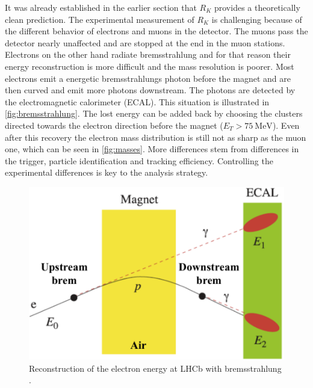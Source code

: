 
It was already established in the earlier section that $R_K$ provides
a theoretically clean prediction.
The experimental measurement of $R_K$ is challenging because
of the different behavior of electrons and muons in the detector.
The muons pass the detector nearly unaffected and are stopped at the end
in the muon stations.
Electrons on the other hand radiate bremsstrahlung and for that
reason their energy reconstruction is more difficult
and the mass resolution is poorer.
Most electrons emit a energetic bremsstrahlungs photon before the magnet and
are then curved and emit more photons downstream. The photons are detected by the
electromagnetic calorimeter (ECAL).
This situation is illustrated
in \autoref{fig:bremsstrahlung}.
The lost energy can be added back by choosing
the clusters directed towards the electron direction before the magnet ($E_{T}>\SI{75}{\mega\electronvolt}$).
Even after this recovery the electron mass distribution is still not as sharp as the muon one, which can
be seen in \autoref{fig:masses}.
More differences stem from differences in the trigger, particle identification and tracking efficiency.
Controlling the experimental differences is key to the analysis strategy.
\begin{figure}
	\centering
	\includegraphics[width=0.8\linewidth]{media/electronbrems.png}
	\caption{Reconstruction of the electron energy at LHCb with bremsstrahlung \cite{petridis2021test}.}%
	\label{fig:bremsstrahlung}
\end{figure}


